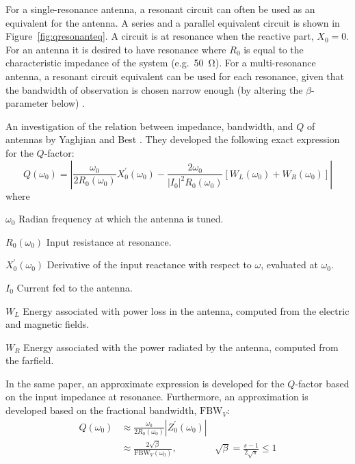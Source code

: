 For a single-resonance antenna, a resonant circuit can often be used as an equivalent for the antenna. A series and a parallel equivalent circuit is shown in Figure~\ref{fig:qresonanteq}. A circuit is at resonance when the reactive part, $X_0=0$. For an antenna it is desired to have resonance where $R_0$ is equal to the characteristic impedance of the system (e.g.\ \SI{50}{\ohm}). For a multi-resonance antenna, a resonant circuit equivalent can be used for each resonance, given that the bandwidth of observation is chosen narrow enough (by altering the $\beta$-parameter below) \cite{yaghjian2005impedance}.

An investigation of the relation between impedance, bandwidth, and $Q$ of antennas by Yaghjian and Best \cite{yaghjian2005impedance}. They developed the following exact expression for the $Q$-factor:
\begin{equation}
    Q(\omega_0) = \left| 
    \frac{\omega_0}{2R_0(\omega_0)}X_0^{\prime}(\omega_0)
    -
    \frac{2\omega_0}{|I_0|^2 R_0(\omega_0)} [W_L(\omega_0) + W_R(\omega_0)]
    \right|
\end{equation}
where
\begin{where}
\item[$\omega_0$] Radian frequency at which the antenna is tuned.
\item[$R_0(\omega_0)$] Input resistance at resonance.
\item[$X^{\prime}_0(\omega_0)$] Derivative of the input reactance with respect to $\omega$, evaluated at $\omega_0$.
\item[$I_0$] Current fed to the antenna.
\item[$W_L$] Energy associated with power loss in the antenna, computed from the electric and magnetic fields.
\item[$W_R$] Energy associated with the power radiated by the antenna, computed from the farfield.
\end{where}
In the same paper, an approximate expression is developed for the $Q$-factor based on the input impedance at resonance. Furthermore, an approximation is developed based on the fractional bandwidth, $\text{FBW}_V$:
\begin{align}
    Q(\omega_0) 
    \label{eq:qapprox1}
    &\approx \frac{\omega_0}{2R_0(\omega_0)} |Z_0^{\prime}(\omega_0)| \\
    \label{eq:qapprox2}
    &\approx \frac{2\sqrt{\beta}}{\text{FBW}_V(\omega_0)}, & \sqrt{\beta} = \frac{s-1}{2\sqrt{s}} \leq 1
\end{align}
